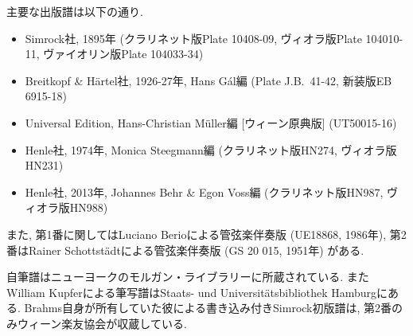 主要な出版譜は以下の通り.
\begin{itemize}
	\item Simrock社, 1895年 (クラリネット版Plate 10408-09, ヴィオラ版Plate 104010-11, ヴァイオリン版Plate 104033-34)
	\item Breitkopf \& Härtel社, 1926-27年, Hans Gál編 (Plate J.B.~41-42, 新装版EB 6915-18)
	\item Universal Edition, Hans-Christian Müller編 [ウィーン原典版] (UT50015-16)
	\item Henle社, 1974年, Monica Steegmann編 (クラリネット版HN274, ヴィオラ版HN231)
	\item Henle社, 2013年, Johannes Behr \& Egon Voss編 (クラリネット版HN987, ヴィオラ版HN988)
\end{itemize}
また, 第1番に関してはLuciano Berioによる管弦楽伴奏版 (UE18868, 1986年), 第2番はRainer Schottstädtによる管弦楽伴奏版 (GS 20 015, 1951年) がある.

自筆譜はニューヨークのモルガン・ライブラリーに所蔵されている. またWilliam Kupferによる筆写譜はStaats- und Universitätsbibliothek Hamburgにある.
Brahms自身が所有していた彼による書き込み付きSimrock初版譜は, 第2番のみウィーン楽友協会が収蔵している.
